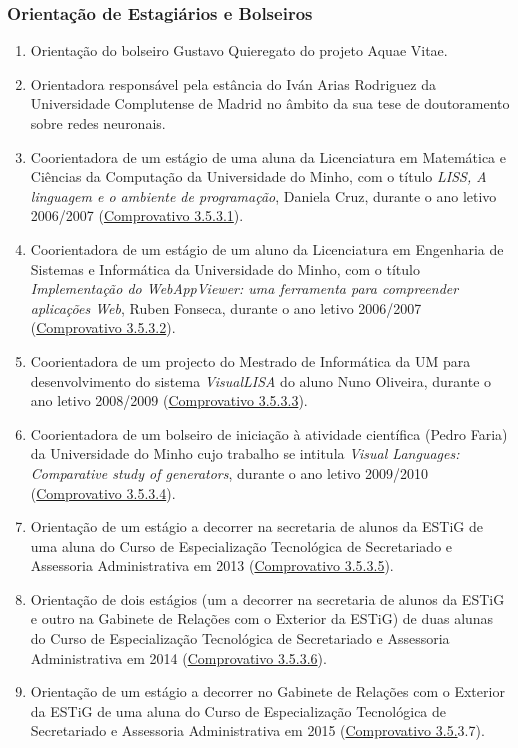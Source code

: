 \documentclass[11pt]{article}
\begin{document}
\subsubsection{Orientação de Estagiários e Bolseiros}
\begin{enumerate}
\item {Orientação do bolseiro Gustavo Quieregato do projeto Aquae Vitae.}
\item {Orientadora responsável pela estância do Iván Arias Rodriguez da Universidade Complutense de Madrid no âmbito da sua tese de doutoramento sobre redes neuronais.}
\item {Coorientadora de um estágio de uma aluna da Licenciatura em Matemática e Ciências da Computação da Universidade do Minho, com o título {\em{ LISS, A linguagem e o ambiente de programação}}, Daniela Cruz, durante o ano letivo 2006/2007  (\href{run:Projectos/declaracoesUM.pdf}{Comprovativo 3.5.3.1}).}
\item {Coorientadora de um estágio de um aluno da Licenciatura em Engenharia de Sistemas e Informática da Universidade do Minho, com o título {\em{ Implementação do WebAppViewer: uma ferramenta para compreender aplicações Web}}, Ruben Fonseca, durante o ano letivo 2006/2007 (\href{run:Projectos/declaracoesUM.pdf}{Comprovativo 3.5.3.2}).}
\item {Coorientadora de um projecto do Mestrado de Informática da UM para desenvolvimento do sistema {\em{ VisualLISA}} do aluno Nuno Oliveira, durante o ano letivo 2008/2009 (\href{run:Projectos/declaracoesUM.pdf}{Comprovativo 3.5.3.3}).}
\item {Coorientadora de um bolseiro de iniciação à atividade científica (Pedro Faria) da Universidade do Minho cujo trabalho se intitula {\em{ Visual Languages: Comparative study of generators}}, durante o ano letivo 2009/2010 (\href{run:Projectos/declaracoesUM.pdf}{Comprovativo 3.5.3.4}).}
\item {Orientação de um estágio a decorrer na secretaria de alunos da ESTiG de uma aluna do Curso de Especialização Tecnológica de Secretariado e Assessoria Administrativa em 2013 (\href{run:CoOrientTrabalhos/estagiosESE.pdf}{Comprovativo 3.5.3.5}).}
\item {Orientação de dois estágios (um a decorrer na secretaria de alunos da ESTiG e outro na Gabinete de Relações com o Exterior da ESTiG) de duas alunas do Curso de Especialização Tecnológica de Secretariado e Assessoria Administrativa em 2014 (\href{run:CoOrientTrabalhos/estagiosESE.pdf}{Comprovativo 3.5.3.6}).}
\item {Orientação de um estágio a decorrer no Gabinete de Relações com o Exterior da ESTiG de uma aluna do Curso de Especialização Tecnológica de Secretariado e Assessoria Administrativa em 2015 (\href{run:CoOrientTrabalhos/estagiosESE.pdf}{Comprovativo 3.5.}3.7).}
\end{enumerate}
\end{document}
